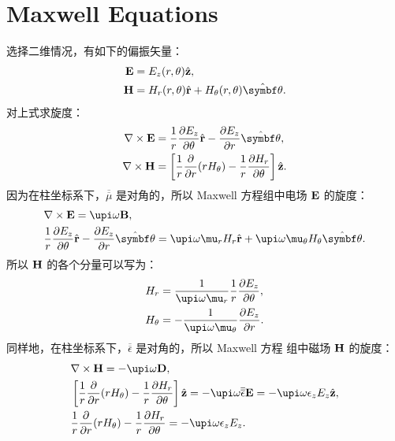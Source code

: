 
\chapter{Maxwell Equations}

选择二维情况，有如下的偏振矢量：
\begin{subequations}
  \begin{align}
    {\bf E} &= E_z(r, \theta) \hat{\bf z}, \\
    {\bf H} &= H_r(r, \theta) \hat{\bf r} + H_\theta(r, \theta) \hat{\bm\theta}.
  \end{align}
\end{subequations}
对上式求旋度：
\begin{subequations}
  \begin{align}
    \nabla \times {\bf E} &= \frac{1}{r} \frac{\partial E_z}{\partial\theta}
      \hat{\bf r} - \frac{\partial E_z}{\partial r} \hat{\bm\theta}, \\
    \nabla \times {\bf H} &= \left[\frac{1}{r} \frac{\partial}{\partial r}
      (r H_\theta) - \frac{1}{r} \frac{\partial H_r}{\partial\theta} \right]
      \hat{\bf z}.
  \end{align}
\end{subequations}
因为在柱坐标系下，$\overline{\overline\mu}$ 是对角的，所以 Maxwell 方程组中电场
$\bf E$ 的旋度：
\begin{subequations}
  \begin{align}
    & \nabla \times {\bf E} = \upi \omega {\bf B}, \\
    & \frac{1}{r} \frac{\partial E_z}{\partial\theta} \hat{\bf r} -
      \frac{\partial E_z}{\partial r}\hat{\bm\theta} = \upi \omega \mu_r H_r
      \hat{\bf r} + \upi \omega \mu_\theta H_\theta \hat{\bm\theta}.
  \end{align}
\end{subequations}
所以 $\bf H$ 的各个分量可以写为：
\begin{subequations}
  \begin{align}
    H_r &= \frac{1}{\upi \omega \mu_r} \frac{1}{r}
      \frac{\partial E_z}{\partial\theta}, \\
    H_\theta &= -\frac{1}{\upi \omega \mu_\theta}
      \frac{\partial E_z}{\partial r}.
  \end{align}
\end{subequations}
同样地，在柱坐标系下，$\overline{\overline\epsilon}$ 是对角的，所以 Maxwell 方程
组中磁场 $\bf H$ 的旋度：
\begin{subequations}
  \begin{align}
    & \nabla \times {\bf H} = -\upi \omega {\bf D}, \\
    & \left[\frac{1}{r} \frac{\partial}{\partial r}(r H_\theta) - \frac{1}{r}
      \frac{\partial H_r}{\partial\theta} \right] \hat{\bf z} = -\upi \omega
      {\overline{\overline\epsilon}} {\bf E} = -\upi \omega \epsilon_z E_z
      \hat{\bf z}, \\
    & \frac{1}{r} \frac{\partial}{\partial r}(r H_\theta) - \frac{1}{r}
      \frac{\partial H_r}{\partial\theta} = -\upi \omega \epsilon_z E_z.
  \end{align}
\end{subequations}
